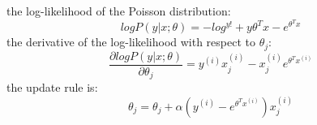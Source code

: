 \begin{answer}
the log-likelihood of the Poisson distribution:
$$log P(y|x;\theta) = -log^{y!} + y \theta^T x - e^{\theta^T x}$$
the derivative of the log-likelihood with respect to $\theta_j$:
$$\frac{\partial log P(y|x;\theta)}{\partial \theta_j} = y^{(i)}x^{(i)}_j - x^{(i)}_je^{\theta^T x^{(i)}}$$
the update rule is:
$$\theta_j = \theta_j + \alpha (y^{(i)} - e^{\theta^T x^{(i)}}) x^{(i)}_j$$
\end{answer}
